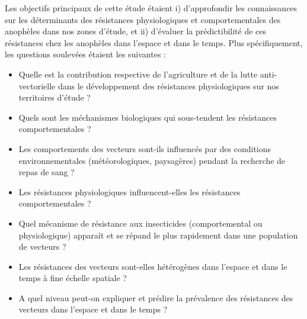 \documentclass[12pt,twoside]{reedthesis}
\providecommand{\tightlist}{%
  \setlength{\itemsep}{0pt}\setlength{\parskip}{0pt}}
\begin{document}
Les objectifs principaux de cette étude étaient i) d'approfondir les connaissances sur les déterminants des résistances physiologiques et comportementales des anophèles dans nos zones d'étude, et ii) d'évaluer la prédictibilité de ces résistances chez les anophèles dans l'espace et dans le temps. Plus spécifiquement, les questions soulevées étaient les suivantes :
\begin{itemize}
\tightlist
\item
  Quelle est la contribution respective de l'agriculture et de la lutte anti-vectorielle dans le développement des résistances physiologiques sur nos territoires d'étude ?
\item
  Quels sont les méchanismes biologiques qui sous-tendent les résistances comportementales ?
\item
  Les comportements des vecteurs sont-ils influencés par des conditions environnementales (météorologiques, paysagères) pendant la recherche de repas de sang ?
\item
  Les résistances physiologiques influencent-elles les résistances comportementales ?
\item
  Quel mécanisme de résistance aux insecticides (comportemental ou physiologique) apparaît et se répand le plus rapidement dans une population de vecteurs ?
\item
  Les résistances des vecteurs sont-elles hétérogènes dans l'espace et dans le temps à fine échelle spatiale ?
\item
  A quel niveau peut-on expliquer et prédire la prévalence des résistances des vecteurs dans l'espace et dans le temps ?
\end{itemize}
\end{document}
